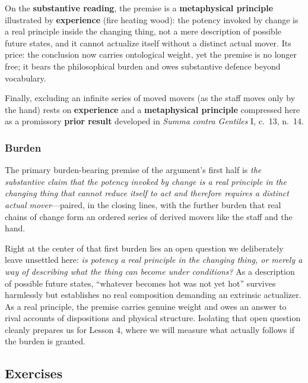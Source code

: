 On the \textbf{substantive reading}, the premise is a \textbf{metaphysical principle} illustrated by \textbf{experience} (fire heating wood): the potency invoked by change is a real principle inside the changing thing, not a mere description of possible future states, and it cannot actualize itself without a distinct actual mover. Its price: the conclusion now carries ontological weight, yet the premise is no longer free; it bears the philosophical burden and owes substantive defence beyond vocabulary.

Finally, excluding an infinite series of moved movers (as the staff moves only by the hand) rests on \textbf{experience} and a \textbf{metaphysical principle} compressed here as a promissory \textbf{prior result} developed in \emph{Summa contra Gentiles} I, c.\ 13, n.\ 14.

\subsubsection*{Burden}
The primary burden-bearing premise of the argument's first half is \emph{the substantive claim that the potency invoked by change is a real principle in the changing thing that cannot reduce itself to act and therefore requires a distinct actual mover}---paired, in the closing lines, with the further burden that real chains of change form an ordered series of derived movers like the staff and the hand.

Right at the center of that first burden lies an open question we deliberately leave unsettled here: \emph{is potency a real principle in the changing thing, or merely a way of describing what the thing can become under conditions?} As a description of possible future states, ``whatever becomes hot was not yet hot'' survives harmlessly but establishes no real composition demanding an extrinsic actualizer. As a real principle, the premise carries genuine weight and owes an answer to rival accounts of dispositions and physical structure. Isolating that open question cleanly prepares us for Lesson 4, where we will measure what actually follows if the burden is granted.

\subsection{Exercises}

